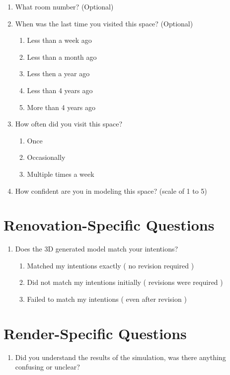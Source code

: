 \begin{enumerate}
\item What room number? (Optional)
\item When was the last time you visited this space? (Optional)
\begin{enumerate}
\item Less than a week ago
\item Less than a month ago
\item Less then a year ago
\item Less than 4 years ago
\item More than 4 years ago
\end{enumerate}
\item How often did you visit this space?
\begin{enumerate}
\item Once
\item Occasionally
\item Multiple times a week
\end{enumerate}
\item How confident are you in modeling this space? (scale of 1 to 5)

\end{enumerate}


\section{Renovation-Specific Questions}
\begin{enumerate}
\item Does the 3D generated model match your intentions?
\begin{enumerate}
\item Matched my intentions exactly ( no revision required )
\item Did not match my intentions initially ( revisions were required )
\item Failed to match my intentions ( even after revision )
\end{enumerate}
\end{enumerate}

\section{Render-Specific Questions}
\begin{enumerate}
\item Did you understand the results of the simulation, was there anything confusing or unclear?
\end{enumerate}
